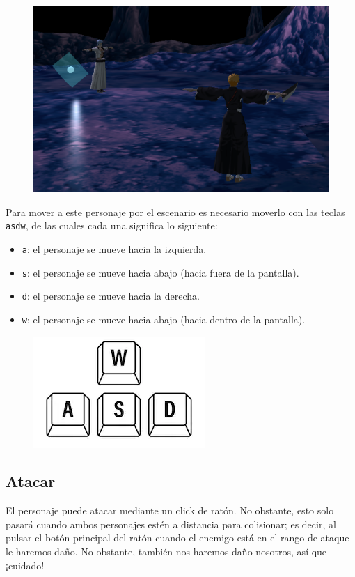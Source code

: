 \documentclass[11pt,a4paper]{article}
\begin{document}
\begin{figure}[H]
	\centering
	\includegraphics[scale=0.4]{img/inicio.png}
\end{figure}

Para mover a este personaje por el escenario es necesario moverlo con las teclas \color{morado}\texttt{asdw}\color{black}, de las cuales cada una significa lo siguiente:

	\begin{itemize}
		\item \color{morado}\texttt{a}\color{black}: el personaje se mueve hacia la izquierda.
		\item \color{morado}\texttt{s}\color{black}: el personaje se mueve hacia abajo (hacia fuera de la pantalla).
		\item \color{morado}\texttt{d}\color{black}: el personaje se mueve hacia la derecha.
		\item \color{morado}\texttt{w}\color{black}: el personaje se mueve hacia abajo (hacia dentro de la pantalla).
	\end{itemize}
	
\begin{figure}[H]
	\centering
	\includegraphics[scale=0.5]{img/teclas.png}
\end{figure}

\subsection{Atacar}

El personaje puede atacar mediante un click de ratón. No obstante, esto solo pasará cuando ambos personajes estén a distancia para colisionar; es decir, al pulsar el botón principal del ratón cuando el enemigo está en el rango de ataque le haremos daño. No obstante, también nos haremos daño nosotros, así que ¡cuidado!
\end{document}
